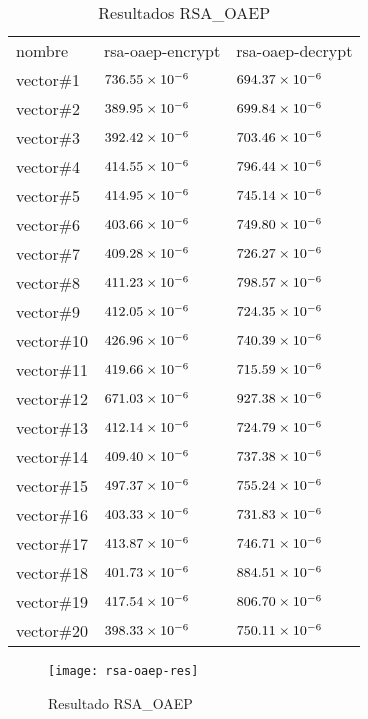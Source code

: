 \documentclass[../main.tex]{subfiles}
\begin{document}
\begin{table*}[]
  \centering
  \caption{Resultados RSA\_OAEP}\label{tab:rsa}
  \begin{tabular}{|m{2cm}<{\centering}|m{2cm}<{\centering}|m{2cm}<{\centering}|}
    \rowcolor[HTML]{000000}
    {\color[HTML]{FFFFFF} nombre} & {\color[HTML]{FFFFFF} rsa-oaep-encrypt} & {\color[HTML]{FFFFFF} rsa-oaep-decrypt} \\
    vector\#1  & $\num{736.55E-06}$ & $\num{694.37E-06}$ \\ \hline
    \rowcolor[HTML]{C0C0C0}
    vector\#2  & $\num{389.95E-06}$ & $\num{699.84E-06}$ \\ \hline
    vector\#3  & $\num{392.42E-06}$ & $\num{703.46E-06}$ \\ \hline
    \rowcolor[HTML]{C0C0C0}
    vector\#4  & $\num{414.55E-06}$ & $\num{796.44E-06}$ \\ \hline
    vector\#5  & $\num{414.95E-06}$ & $\num{745.14E-06}$ \\ \hline
    \rowcolor[HTML]{C0C0C0}
    vector\#6  & $\num{403.66E-06}$ & $\num{749.80E-06}$ \\ \hline
    vector\#7  & $\num{409.28E-06}$ & $\num{726.27E-06}$ \\ \hline
    \rowcolor[HTML]{C0C0C0}
    vector\#8  & $\num{411.23E-06}$ & $\num{798.57E-06}$ \\ \hline
    vector\#9  & $\num{412.05E-06}$ & $\num{724.35E-06}$ \\ \hline
    \rowcolor[HTML]{C0C0C0}
    vector\#10 & $\num{426.96E-06}$ & $\num{740.39E-06}$ \\ \hline
    vector\#11 & $\num{419.66E-06}$ & $\num{715.59E-06}$ \\ \hline
    \rowcolor[HTML]{C0C0C0}
    vector\#12 & $\num{671.03E-06}$ & $\num{927.38E-06}$ \\ \hline
    vector\#13 & $\num{412.14E-06}$ & $\num{724.79E-06}$ \\ \hline
    \rowcolor[HTML]{C0C0C0}
    vector\#14 & $\num{409.40E-06}$ & $\num{737.38E-06}$ \\ \hline
    vector\#15 & $\num{497.37E-06}$ & $\num{755.24E-06}$ \\ \hline
    \rowcolor[HTML]{C0C0C0}
    vector\#16 & $\num{403.33E-06}$ & $\num{731.83E-06}$ \\ \hline
    vector\#17 & $\num{413.87E-06}$ & $\num{746.71E-06}$ \\ \hline
    \rowcolor[HTML]{C0C0C0}
    vector\#18 & $\num{401.73E-06}$ & $\num{884.51E-06}$ \\ \hline
    vector\#19 & $\num{417.54E-06}$ & $\num{806.70E-06}$ \\ \hline
    \rowcolor[HTML]{C0C0C0}
    vector\#20 & $\num{398.33E-06}$ & $\num{750.11E-06}$ \\ \hline
  \end{tabular}
\end{table*}
\begin{figure}
  \centering
  \texttt{[image: rsa-oaep-res]}
  \caption{Resultado RSA\_OAEP}\label{fig:rsa-oaep}
\end{figure}
\end{document}
